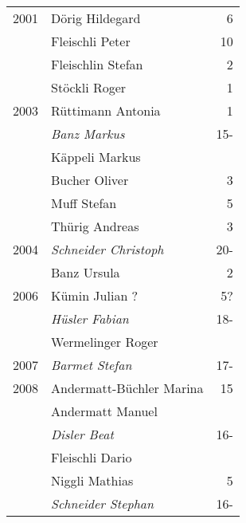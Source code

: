 {\begin{longtable}{ l l r }
        2001          & Dörig Hildegard                           & 6           \\
                      & Fleischli Peter                           & 10          \\
                      & Fleischlin Stefan                         & 2           \\
                      & Stöckli Roger                             & 1           \\
        2003          & Rüttimann Antonia                         & 1           \\
                      & \emph{Banz Markus}                        & 15-         \\
                      & Käppeli Markus                            &             \\
                      & Bucher Oliver                             & 3           \\
                      & Muff Stefan                               & 5           \\
                      & Thürig Andreas                            & 3           \\
        2004          & \emph{Schneider Christoph}                & 20-         \\
                      & Banz Ursula                               & 2           \\
        2006          & Kümin Julian ?                            & 5?          \\
                      & \emph{Hüsler Fabian}                      & 18-         \\
                      & Wermelinger Roger                         &             \\
        2007          & \emph{Barmet Stefan}                      & 17-         \\
        2008          & Andermatt-Büchler Marina                  & 15          \\
                      & Andermatt Manuel                          &             \\
                      & \emph{Disler Beat}                        & 16-         \\
                      & Fleischli Dario                           &             \\
                      & Niggli Mathias                            & 5           \\
                      & \emph{Schneider Stephan}                  & 16-         \\

\end{longtable}}
